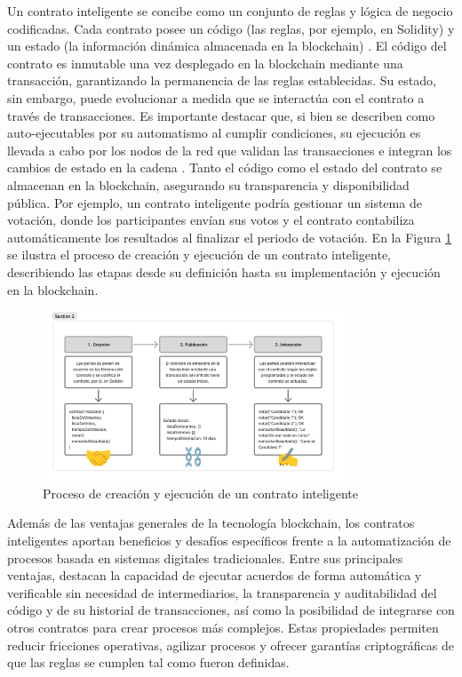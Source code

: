 Un contrato inteligente se concibe como un conjunto de reglas y lógica de negocio codificadas. Cada contrato posee un código (las reglas, por ejemplo, en Solidity) y un estado (la información dinámica almacenada en la blockchain) \cite{buterin2013ethereum}. El código del contrato es inmutable una vez desplegado en la blockchain mediante una transacción, garantizando la permanencia de las reglas establecidas. Su estado, sin embargo, puede evolucionar a medida que se interactúa con el contrato a través de transacciones. Es importante destacar que, si bien se describen como auto-ejecutables por su automatismo al cumplir condiciones, su ejecución es llevada a cabo por los nodos de la red que validan las transacciones e integran los cambios de estado en la cadena \cite{buterin2013ethereum}. Tanto el código como el estado del contrato se almacenan en la blockchain, asegurando su transparencia y disponibilidad pública. Por ejemplo, un contrato inteligente podría gestionar un sistema de votación, donde los participantes envían sus votos y el contrato contabiliza automáticamente los resultados al finalizar el periodo de votación. En la Figura \ref{fig:smart-contract-process} se ilustra el proceso de creación y ejecución de un contrato inteligente, describiendo las etapas desde su definición hasta su implementación y ejecución en la blockchain.

\begin{figure}[!tb]
    \centering
    \includegraphics[width=0.8\textwidth]{Figures/smart-contract-process-voting.png}
    \caption{Proceso de creación y ejecución de un contrato inteligente}
    \label{fig:smart-contract-process}
\end{figure}

Además de las ventajas generales de la tecnología blockchain, los contratos inteligentes aportan beneficios y desafíos específicos frente a la automatización de procesos basada en sistemas digitales tradicionales. Entre sus principales ventajas, destacan la capacidad de ejecutar acuerdos de forma automática y verificable sin necesidad de intermediarios, la transparencia y auditabilidad del código y de su historial de transacciones, así como la posibilidad de integrarse con otros contratos para crear procesos más complejos. Estas propiedades permiten reducir fricciones operativas, agilizar procesos y ofrecer garantías criptográficas de que las reglas se cumplen tal como fueron definidas.

